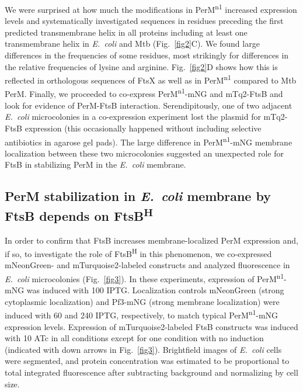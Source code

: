 \documentclass[pdflatex,sn-basic]{sn-jnl}%
\newcommand\ec{\textit{E.~coli}}
\newcommand\mtb{Mtb}
\newcommand\ftsbH{FtsB\textsuperscript{H}}
\newcommand\permN{PerM\textsuperscript{n1}}
\begin{document}
We were surprised at how much the modifications in \permN{} increased expression levels and systematically investigated sequences in residues preceding the first predicted transmembrane helix in all proteins including at least one transmembrane helix in \ec{} and \mtb{} (Fig.~\ref{fig2}C).
We found large differences in the frequencies of some residues, most strikingly for differences in the relative frequencies of lysine and arginine. Fig.~\ref{fig2}D shows how this is reflected in orthologous sequences of FtsX as well as in \permN{} compared to \mtb{} PerM.
Finally, we proceeded to co-express \permN{}-mNG and mTq2-FtsB and look for evidence of PerM-FtsB interaction.
Serendipitously, one of two adjacent \ec{} microcolonies in a co-expression experiment lost the plasmid for mTq2-FtsB expression (this occasionally happened without including selective antibiotics in agarose gel pads).
The large difference in \permN{}-mNG membrane localization between these two microcolonies suggested an unexpected role for FtsB in stabilizing PerM in the \ec{} membrane.

\subsection{PerM stabilization in \ec{} membrane by FtsB depends on \ftsbH{}}

In order to confirm that FtsB increases membrane-localized PerM expression and, if so, to investigate the role of \ftsbH{} in this phenomenon, we co-expressed mNeonGreen- and mTurquoise2-labeled constructs and analyzed fluorescence in \ec{} microcolonies (Fig.~\ref{fig3}). In these experiments, expression of \permN{}-mNG was induced with \qty{100}{\uM} IPTG. Localization controls mNeonGreen (strong cytoplasmic localization) and Pf3-mNG (strong membrane localization) were induced with \qty{60}{\uM} and \qty{240}{\uM} IPTG, respectively, to match typical \permN{}-mNG expression levels. Expression of mTurquoise2-labeled FtsB constructs was induced with \qty{10}{\nM} ATc in all conditions except for one condition with no induction (indicated with down arrows in Fig.~\ref{fig3}). Brightfield images of \ec{} cells were segmented, and protein concentration was estimated to be proportional to total integrated fluorescence after subtracting background and normalizing by cell size.
\end{document}
